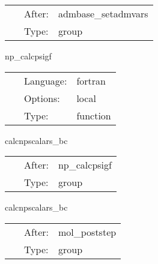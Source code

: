 \hspace{5mm}

 \begin{tabular*}{160mm}{cll} 
~ & After:  & admbase\_setadmvars \\ 
~ & Type:  & group \\ 
\end{tabular*} 


\vspace{5mm}


\hspace{5mm} np\_calcpsigf 

\hspace{5mm}{\it calculate psi4 as grid function } 


\hspace{5mm}

 \begin{tabular*}{160mm}{cll} 
~ & Language:  & fortran \\ 
~ & Options:  & local \\ 
~ & Type:  & function \\ 
\end{tabular*} 


\vspace{5mm}


\hspace{5mm} calcnpscalars\_bc 

\hspace{5mm}{\it boundary conditions } 


\hspace{5mm}

 \begin{tabular*}{160mm}{cll} 
~ & After:  & np\_calcpsigf \\ 
~ & Type:  & group \\ 
\end{tabular*} 


\vspace{5mm}


\hspace{5mm} calcnpscalars\_bc 

\hspace{5mm}{\it boundary conditions } 


\hspace{5mm}

 \begin{tabular*}{160mm}{cll} 
~ & After:  & mol\_poststep \\ 
~ & Type:  & group \\ 
\end{tabular*} 


